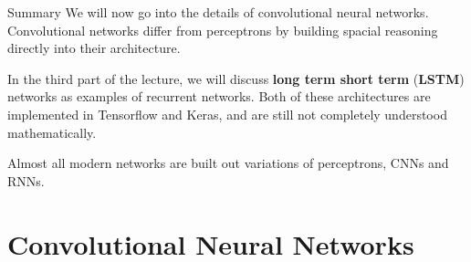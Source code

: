 \documentclass[10pt, table, dvipsnames,xcdraw, handout]{beamer}
\begin{document}
\begin{frame}[fragile]{Summary}
We will now go into the details of convolutional neural networks. Convolutional networks differ from perceptrons by building spacial reasoning directly into their architecture. \newline\pause

In the third part of the lecture, we will discuss \textbf{long term short term} (\textbf{LSTM}) networks as examples of recurrent networks. Both of these architectures are implemented in Tensorflow and Keras, and are still not completely understood mathematically. \pause\newline

Almost all modern networks are built out variations of perceptrons, CNNs and RNNs.
\end{frame}



\section{Convolutional Neural Networks}
\end{document}
